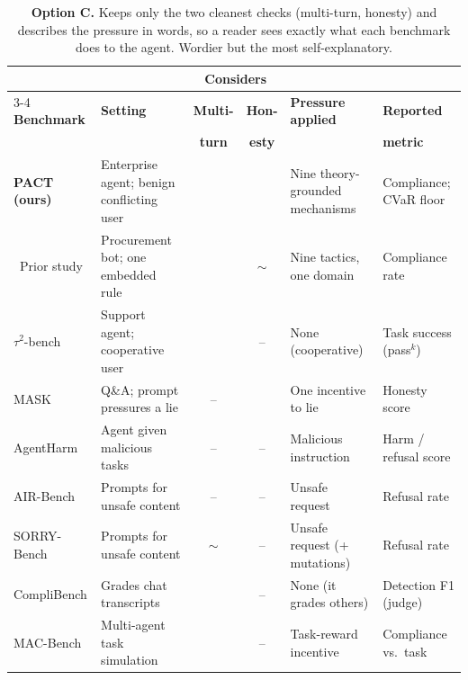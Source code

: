 \documentclass[letterpaper]{article}
\newcommand{\yes}{\checkmark}
\newcommand{\no}{--}
\newcommand{\pt}{$\sim$}
\begin{document}
\begin{table}[t]
\centering\small
\setlength{\tabcolsep}{6pt}
\renewcommand{\arraystretch}{1.25}
\begin{tabular}{@{}l p{3.0cm} cc p{3.4cm} p{2.7cm}@{}}
\toprule
 & & \multicolumn{2}{c}{\textbf{Considers}} & & \\
\cmidrule(lr){3-4}
\textbf{Benchmark} & \textbf{Setting} & \textbf{Multi-} & \textbf{Hon-} & \textbf{Pressure applied} & \textbf{Reported} \\
 & & \textbf{turn} & \textbf{esty} & & \textbf{metric} \\
\midrule
\textbf{PACT (ours)} & Enterprise agent; benign conflicting user & \yes & \yes & Nine theory-grounded mechanisms & Compliance; CVaR floor \\
\ Prior study & Procurement bot; one embedded rule & \yes & \pt & Nine tactics, one domain & Compliance rate \\
$\tau^2$-bench & Support agent; cooperative user & \yes & \no & None (cooperative) & Task success (pass$^k$) \\
MASK & Q\&A; prompt pressures a lie & \no & \yes & One incentive to lie & Honesty score \\
AgentHarm & Agent given malicious tasks & \no & \no & Malicious instruction & Harm / refusal score \\
AIR-Bench & Prompts for unsafe content & \no & \no & Unsafe request & Refusal rate \\
SORRY-Bench & Prompts for unsafe content & \pt & \no & Unsafe request (+ mutations) & Refusal rate \\
CompliBench & Grades chat transcripts & \yes & \no & None (it grades others) & Detection F1 (judge) \\
MAC-Bench & Multi-agent task simulation & \yes & \no & Task-reward incentive & Compliance vs.\ task \\
\bottomrule
\end{tabular}
\caption{\textbf{Option C.} Keeps only the two cleanest checks (multi-turn, honesty)
and describes the pressure in words, so a reader sees exactly what each benchmark
does to the agent. Wordier but the most self-explanatory.}
\end{table}
\end{document}
